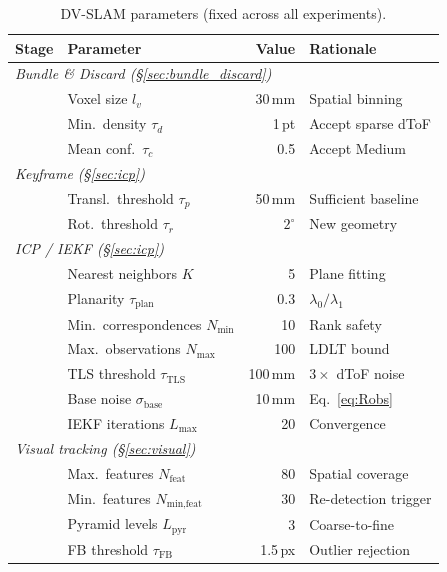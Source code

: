 \begin{table}[t]
    \centering
    \caption{DV-SLAM parameters (fixed across all experiments).}
    \label{tab:parameters}
    \setlength{\tabcolsep}{3pt}
    \footnotesize
    \begin{tabular}{llrl}
        \toprule
        Stage & Parameter & Value & Rationale \\
        \midrule
        \multicolumn{4}{l}{\textit{Bundle \& Discard (\S\ref{sec:bundle_discard})}} \\
        & Voxel size $l_v$ & 30\,mm & Spatial binning \\
        & Min.\ density $\tau_d$ & 1\,pt & Accept sparse dToF \\
        & Mean conf.\ $\tau_c$ & 0.5 & Accept Medium \\
        \midrule
        \multicolumn{4}{l}{\textit{Keyframe (\S\ref{sec:icp})}} \\
        & Transl.\ threshold $\tau_p$ & 50\,mm & Sufficient baseline \\
        & Rot.\ threshold $\tau_r$ & $2^\circ$ & New geometry \\
        \midrule
        \multicolumn{4}{l}{\textit{ICP / IEKF (\S\ref{sec:icp})}} \\
        & Nearest neighbors $K$ & 5 & Plane fitting \\
        & Planarity $\tau_\text{plan}$ & 0.3 & $\lambda_0/\lambda_1$ \\
        & Min.\ correspondences $N_\text{min}$ & 10 & Rank safety \\
        & Max.\ observations $N_\text{max}$ & 100 & LDLT bound \\
        & TLS threshold $\tau_\text{TLS}$ & 100\,mm & $3\times$ dToF noise \\
        & Base noise $\sigma_\text{base}$ & 10\,mm & Eq.~\eqref{eq:Robs} \\
        & IEKF iterations $L_\text{max}$ & 20 & Convergence \\
        \midrule
        \multicolumn{4}{l}{\textit{Visual tracking (\S\ref{sec:visual})}} \\
        & Max.\ features $N_\text{feat}$ & 80 & Spatial coverage \\
        & Min.\ features $N_\text{min,feat}$ & 30 & Re-detection trigger \\
        & Pyramid levels $L_\text{pyr}$ & 3 & Coarse-to-fine \\
        & FB threshold $\tau_\text{FB}$ & 1.5\,px & Outlier rejection \\

\end{tabular}
\end{table}
